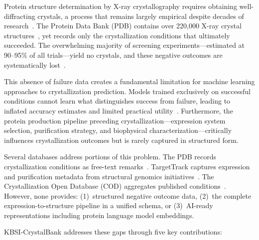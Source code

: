 \documentclass[11pt]{article}
\begin{document}
Protein structure determination by X-ray crystallography requires obtaining well-diffracting crystals, a process that remains largely empirical despite decades of research~\cite{mcpherson2014,chayen2008}. The Protein Data Bank (PDB) contains over 220,000 X-ray crystal structures~\cite{berman2000}, yet records only the crystallization conditions that ultimately succeeded. The overwhelming majority of screening experiments---estimated at 90--95\% of all trials---yield no crystals, and these negative outcomes are systematically lost~\cite{newman2005,rupp2009}.

This absence of failure data creates a fundamental limitation for machine learning approaches to crystallization prediction. Models trained exclusively on successful conditions cannot learn what distinguishes success from failure, leading to inflated accuracy estimates and limited practical utility~\cite{overton2006}. Furthermore, the protein production pipeline preceding crystallization---expression system selection, purification strategy, and biophysical characterization---critically influences crystallization outcomes but is rarely captured in structured form.

Several databases address portions of this problem. The PDB records crystallization conditions as free-text remarks~\cite{berman2000}. TargetTrack captures expression and purification metadata from structural genomics initiatives~\cite{berman2009psi}. The Crystallization Open Database (COD) aggregates published conditions~\cite{grazulis2012}. However, none provides: (1)~structured negative outcome data, (2)~the complete expression-to-structure pipeline in a unified schema, or (3)~AI-ready representations including protein language model embeddings.

KBSI-CrystalBank addresses these gaps through five key contributions:
\end{document}
